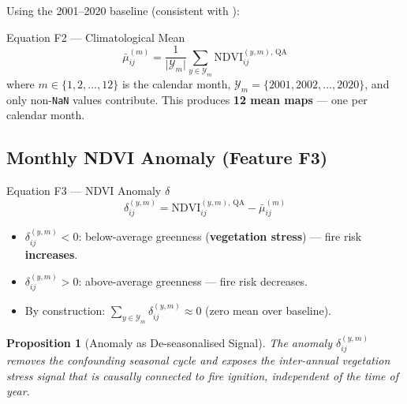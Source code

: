 \documentclass[12pt, a4paper]{article}
\newtheorem{proposition}{Proposition}[section]
\begin{document}
Using the 2001--2020 baseline (consistent with \citealt{biswas2025}):

\begin{mathbox}{Equation F2 — Climatological Mean}
\begin{equation}
  \bar{\mu}_{ij}^{(m)} =
  \frac{1}{\lvert\mathcal{Y}_{m}\rvert}
  \sum_{y \in \mathcal{Y}_{m}}
  \mathrm{NDVI}_{ij}^{(y,m),\,\mathrm{QA}}
  \label{eq:clim_mean}
\end{equation}
where $m \in \{1, 2, \ldots, 12\}$ is the calendar month,
$\mathcal{Y}_{m} = \{2001, 2002, \ldots, 2020\}$,
and only non-\texttt{NaN} values contribute.
This produces \textbf{12 mean maps} --- one per calendar month.
\end{mathbox}

\subsection{Monthly NDVI Anomaly (Feature F3)}

\begin{mathbox}{Equation F3 — NDVI Anomaly $\delta$}
\begin{equation}
  \boxed{
    \delta_{ij}^{(y,m)} =
    \mathrm{NDVI}_{ij}^{(y,m),\,\mathrm{QA}} - \bar{\mu}_{ij}^{(m)}
  }
  \label{eq:anomaly}
\end{equation}
\begin{itemize}
  \item $\delta_{ij}^{(y,m)} < 0$: below-average greenness
        (\textbf{vegetation stress}) --- fire risk \textbf{increases}.
  \item $\delta_{ij}^{(y,m)} > 0$: above-average greenness
        --- fire risk decreases.
  \item By construction: $\sum_{y \in \mathcal{Y}_m}
        \delta_{ij}^{(y,m)} \approx 0$
        (zero mean over baseline).
\end{itemize}
\end{mathbox}

\begin{proposition}[Anomaly as De-seasonalised Signal]
The anomaly $\delta_{ij}^{(y,m)}$ removes the confounding seasonal
cycle and exposes the inter-annual vegetation stress signal that is
causally connected to fire ignition, independent of the time of year.
\end{proposition}
\end{document}
